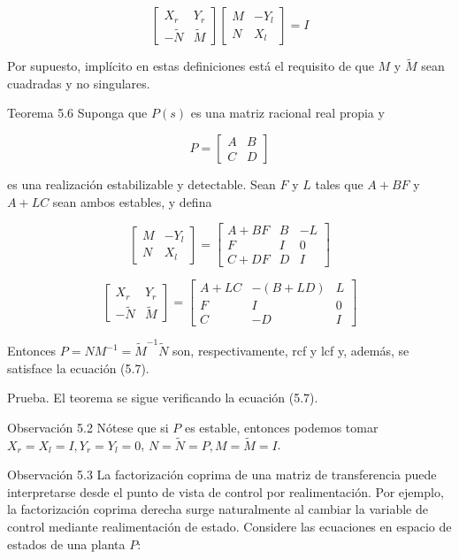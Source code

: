 \[
\left[\begin{array}{cc}
X_{r} & Y_{r}  \tag{5.7}\\
-\tilde{N} & \tilde{M}
\end{array}\right]\left[\begin{array}{cc}
M & -Y_{l} \\
N & X_{l}
\end{array}\right]=I
\]

Por supuesto, implícito en estas definiciones está el requisito de que $M$ y $\tilde{M}$ sean cuadradas y no singulares.

Teorema 5.6 Suponga que $P(s)$ es una matriz racional real propia y

$$
P=\left[\begin{array}{l|l}
A & B \\
\hline C & D
\end{array}\right]
$$

es una realización estabilizable y detectable. Sean $F$ y $L$ tales que $A+B F$ y $A+L C$ sean ambos estables, y defina

\[
\left[\begin{array}{cc}
M & -Y_{l}  \tag{5.8}\\
N & X_{l}
\end{array}\right]=\left[\begin{array}{c|cc}
A+B F & B & -L \\
\hline F & I & 0 \\
C+D F & D & I
\end{array}\right]
\]

\[
\left[\begin{array}{cc}
X_{r} & Y_{r}  \tag{5.9}\\
-\tilde{N} & \tilde{M}
\end{array}\right]=\left[\begin{array}{c|cc}
A+L C & -(B+L D) & L \\
\hline F & I & 0 \\
C & -D & I
\end{array}\right]
\]

Entonces $P=N M^{-1}=\tilde{M}^{-1} \tilde{N}$ son, respectivamente, rcf y lcf y, además, se satisface la ecuación (5.7).

Prueba. El teorema se sigue verificando la ecuación (5.7).

Observación 5.2 Nótese que si $P$ es estable, entonces podemos tomar $X_{r}=X_{l}=I, Y_{r}=Y_{l}=0$, $N=\tilde{N}=P, M=\tilde{M}=I$.

Observación 5.3 La factorización coprima de una matriz de transferencia puede interpretarse desde el punto de vista de control por realimentación. Por ejemplo, la factorización coprima derecha surge naturalmente al cambiar la variable de control mediante realimentación de estado. Considere las ecuaciones en espacio de estados de una planta $P$:

